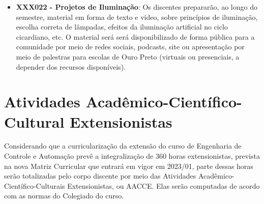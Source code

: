 \documentclass[
	12pt,				%
	openright,			%
	oneside,			%
	a4paper,			%
	english,			%
	brazil				%
	]{abntex2}
\begin{document}
\begin{itemize}
    \item \textbf{XXX022 - Projetos de Iluminação}: Os discentes prepararão, ao longo do semestre, material em forma de texto e vídeo, sobre princípios de iluminação, escolha correta de lâmpadas, efeitos da iluminação artificial no ciclo cicardiano, etc. O material será será disponibilizado de forma pública para a comunidade por meio de redes sociais, podcasts, site ou apresentação por meio de palestras para escolas de Ouro Preto (virtuais ou presenciais, a depender dos recursos disponíveis).
%
%
\end{itemize}

\section{Atividades Acadêmico-Científico-Cultural Extensionistas}

Considerando que a curricularização da extensão do curso de Engenharia de Controle e Automação prevê a integralização de 360 horas extensionistas, prevista na nova Matriz Curricular que entrará em vigor em 2023/01, parte dessas horas serão totalizadas pelo corpo discente por meio das Atividades Acadêmico-Científico-Culturais Extensionistas, ou AACCE.
Elas serão computadas de acordo com as normas do Colegiado do curso.
\end{document}
